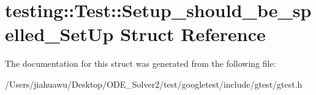 \hypertarget{structtesting_1_1_test_1_1_setup__should__be__spelled___set_up}{}\section{testing\+:\+:Test\+:\+:Setup\+\_\+should\+\_\+be\+\_\+spelled\+\_\+\+Set\+Up Struct Reference}
\label{structtesting_1_1_test_1_1_setup__should__be__spelled___set_up}


The documentation for this struct was generated from the following file\+:\begin{DoxyCompactItemize}
\item 
/\+Users/jiahuawu/\+Desktop/\+O\+D\+E\+\_\+\+Solver2/test/googletest/include/gtest/gtest.\+h\end{DoxyCompactItemize}
